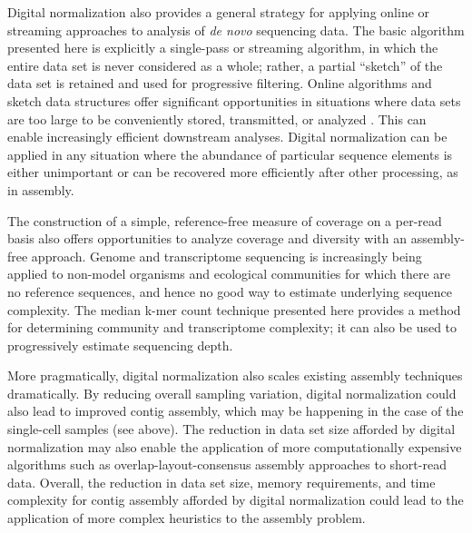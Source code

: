 \documentclass{pnastwo}
\begin{document}
\begin{article}
Digital normalization also provides a general strategy for applying
online or streaming approaches to analysis of {\em de novo} sequencing
data.  The basic algorithm presented here is explicitly a single-pass or streaming
algorithm, in which the entire data set is never considered as a
whole; rather, a partial ``sketch'' of the data set is retained and
used for progressive filtering.  Online algorithms and sketch data
structures offer significant opportunities in situations where data
sets are too large to be conveniently stored, transmitted, or analyzed
\cite{muthukrishnan2005data}.  This can enable increasingly efficient
downstream analyses.
Digital normalization can be applied in any situation where the
abundance of particular sequence elements is either unimportant or can be
recovered more efficiently after other processing, as in assembly.

The construction of a simple, reference-free measure of coverage on a
per-read basis also offers opportunities to analyze coverage and
diversity with an assembly-free approach.  Genome and transcriptome
sequencing is increasingly being applied to non-model organisms and
ecological communities for which there are no reference sequences, and
hence no good way to estimate underlying sequence complexity.  The
median k-mer count technique presented here provides a method for
determining community and transcriptome complexity;
it can also be used to progressively estimate sequencing depth.

More pragmatically, digital normalization also scales existing
assembly techniques dramatically.  By reducing overall sampling
variation, digital normalization could also lead to improved contig
assembly, which may be happening in the case of the single-cell
samples (see above).  The reduction in data set size afforded by
digital normalization may also enable the application of more
computationally expensive algorithms such as overlap-layout-consensus
assembly approaches to short-read data.  Overall, the reduction in
data set size, memory requirements, and time complexity for contig
assembly afforded by digital normalization could lead to the
application of more complex heuristics to the assembly problem.



\end{article}
\end{document}
